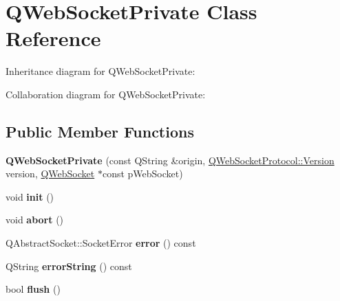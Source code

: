 \hypertarget{class_q_web_socket_private}{}\section{Q\+Web\+Socket\+Private Class Reference}
\label{class_q_web_socket_private}


Inheritance diagram for Q\+Web\+Socket\+Private\+:


Collaboration diagram for Q\+Web\+Socket\+Private\+:
\subsection*{Public Member Functions}
\begin{DoxyCompactItemize}
\item 
\mbox{\label{class_q_web_socket_private_a5413f5eda6c8860b57cc81930d1a4527}} 
{\bfseries Q\+Web\+Socket\+Private} (const Q\+String \&origin, \mbox{\hyperlink{namespace_q_web_socket_protocol_ad53f2684577effe0a517eadb48714df3}{Q\+Web\+Socket\+Protocol\+::\+Version}} version, \mbox{\hyperlink{class_q_web_socket}{Q\+Web\+Socket}} $\ast$const p\+Web\+Socket)
\item 
\mbox{\label{class_q_web_socket_private_a30cf7429516a3122df97829927dbacc1}} 
void {\bfseries init} ()
\item 
\mbox{\label{class_q_web_socket_private_a197288c717531569a090e2506cafc98b}} 
void {\bfseries abort} ()
\item 
\mbox{\label{class_q_web_socket_private_a6e59b60b6e71fae9167357dae68753b3}} 
Q\+Abstract\+Socket\+::\+Socket\+Error {\bfseries error} () const
\item 
\mbox{\label{class_q_web_socket_private_abec29a26dc722e0b77230b82d2e58f55}} 
Q\+String {\bfseries error\+String} () const
\item 
\mbox{\label{class_q_web_socket_private_a27a36542bd56be28618e3eca4289b60e}} 
bool {\bfseries flush} ()
\item 
\mbox{\label{class_q_web_socket_private_a77c2fa7ccf043018ccbb01e49d8ecdec}} 

\end{DoxyCompactItemize}
